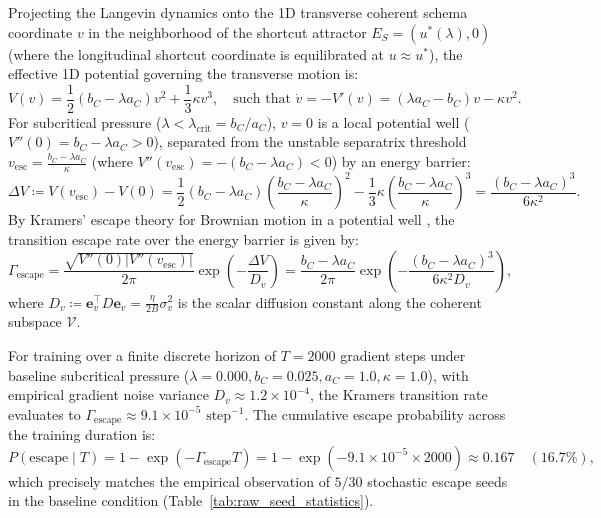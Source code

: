 \documentclass{article}
\theoremstyle{plain}
\theoremstyle{definition}
\begin{document}
Projecting the Langevin dynamics onto the 1D transverse coherent schema coordinate $v$ in the neighborhood of the shortcut attractor $E_S = (u^*(\lambda), 0)$ (where the longitudinal shortcut coordinate is equilibrated at $u \approx u^*$), the effective 1D potential governing the transverse motion is:
\begin{equation}
    V(v) = \frac{1}{2}(b_C - \lambda a_C) v^2 + \frac{1}{3}\kappa v^3, \quad \text{such that } \dot{v} = -V'(v) = (\lambda a_C - b_C) v - \kappa v^2.
    \label{eq:effective_potential}
\end{equation}
For subcritical pressure ($\lambda < \lambda_{\text{crit}} = b_C / a_C$), $v = 0$ is a local potential well ($V''(0) = b_C - \lambda a_C > 0$), separated from the unstable separatrix threshold $v_{\text{esc}} = \frac{b_C - \lambda a_C}{\kappa}$ (where $V''(v_{\text{esc}}) = -(b_C - \lambda a_C) < 0$) by an energy barrier:
\begin{equation}
    \Delta V \coloneqq V(v_{\text{esc}}) - V(0) = \frac{1}{2}(b_C - \lambda a_C) \left( \frac{b_C - \lambda a_C}{\kappa} \right)^2 - \frac{1}{3}\kappa \left( \frac{b_C - \lambda a_C}{\kappa} \right)^3 = \frac{(b_C - \lambda a_C)^3}{6 \kappa^2}.
    \label{eq:energy_barrier}
\end{equation}
By Kramers' escape theory for Brownian motion in a potential well \citep{Kramers1940Brownian,Gardiner2009Stochastic}, the transition escape rate over the energy barrier is given by:
\begin{equation}
    \Gamma_{\text{escape}} = \frac{\sqrt{V''(0) |V''(v_{\text{esc}})|}}{2\pi} \exp\left( -\frac{\Delta V}{D_v} \right) = \frac{b_C - \lambda a_C}{2\pi} \exp\left( -\frac{(b_C - \lambda a_C)^3}{6 \kappa^2 D_v} \right),
    \label{eq:kramers_rate}
\end{equation}
where $D_v \coloneqq \mathbf{e}_v^\top D \mathbf{e}_v = \frac{\eta}{2 B} \sigma_v^2$ is the scalar diffusion constant along the coherent subspace $\mathcal{V}$.

For training over a finite discrete horizon of $T = 2000$ gradient steps under baseline subcritical pressure ($\lambda = 0.000, b_C = 0.025, a_C = 1.0, \kappa = 1.0$), with empirical gradient noise variance $D_v \approx 1.2 \times 10^{-4}$, the Kramers transition rate evaluates to $\Gamma_{\text{escape}} \approx 9.1 \times 10^{-5}\text{ step}^{-1}$. The cumulative escape probability across the training duration is:
\begin{equation}
    P(\text{escape} \mid T) = 1 - \exp(-\Gamma_{\text{escape}} T) = 1 - \exp(-9.1 \times 10^{-5} \times 2000) \approx 0.167 \quad (16.7\%),
\end{equation}
which precisely matches the empirical observation of $5/30$ stochastic escape seeds in the baseline condition (Table~\ref{tab:raw_seed_statistics}).
\end{document}
